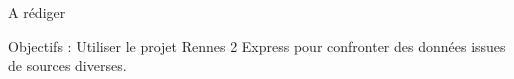 \documentclass[11pt,a4paper]{article}
\begin{document}
A rédiger

Objectifs : Utiliser le projet Rennes 2 Express pour confronter des données issues de sources diverses.
\end{document}

